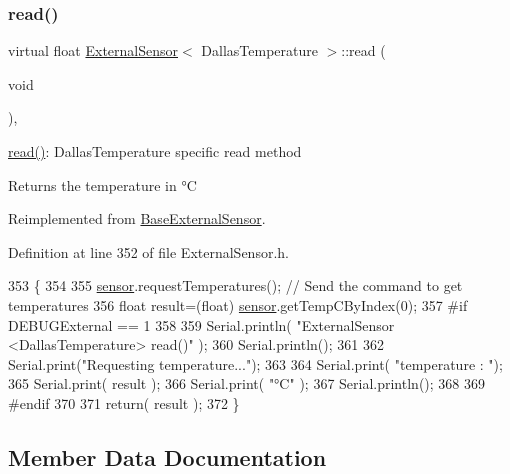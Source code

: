 \subsubsection{\texorpdfstring{read()}{read()}}
{\footnotesize\ttfamily virtual float \hyperlink{class_external_sensor}{External\+Sensor}$<$ Dallas\+Temperature $>$\+::read (\begin{DoxyParamCaption}\item[{void}]{ }\end{DoxyParamCaption})\hspace{0.3cm}{\ttfamily [inline]}, {\ttfamily [virtual]}}

\hyperlink{class_external_sensor_3_01_dallas_temperature_01_4_a1e725d9338314515d4e5dc456ed6a6c8}{read()}\+: Dallas\+Temperature specific read method

\begin{DoxyReturn}{Returns}
the temperature in °C 
\end{DoxyReturn}


Reimplemented from \hyperlink{class_base_external_sensor_a1564f16deacf57b51b9948ac29db4291}{Base\+External\+Sensor}.



Definition at line 352 of file External\+Sensor.\+h.


\begin{DoxyCode}
353     \{
354 
355         \hyperlink{class_external_sensor_3_01_dallas_temperature_01_4_adb6ba4fcdedef95ad8f6b0c9b6c0f9d1}{sensor}.requestTemperatures(); \textcolor{comment}{// Send the command to get temperatures}
356         \textcolor{keywordtype}{float} result=(float) \hyperlink{class_external_sensor_3_01_dallas_temperature_01_4_adb6ba4fcdedef95ad8f6b0c9b6c0f9d1}{sensor}.getTempCByIndex(0);
357 \textcolor{preprocessor}{    #if DEBUGExternal == 1 }
358 
359         Serial.println( \textcolor{stringliteral}{"ExternalSensor <DallasTemperature> read()"} );
360         Serial.println();
361 
362         Serial.print(\textcolor{stringliteral}{"Requesting temperature..."});
363 
364         Serial.print( \textcolor{stringliteral}{"temperature : "});
365         Serial.print( result );
366         Serial.print( \textcolor{stringliteral}{"°C"} );
367         Serial.println();
368     
369 \textcolor{preprocessor}{    #endif}
370         
371         \textcolor{keywordflow}{return}( result );
372     \}
\end{DoxyCode}


\subsection{Member Data Documentation}
\mbox{\label{class_external_sensor_3_01_dallas_temperature_01_4_a7d9e9d2893e453638fcf440e5d8d9082}} 
